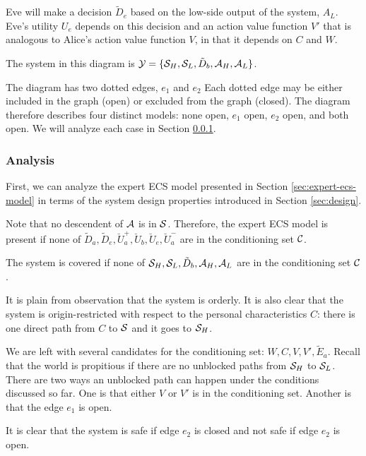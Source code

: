 \documentclass[../thesis.tex]{subfiles}
\begin{document}

Eve will make a decision $\tilde{D}_e$ based on
the low-side output of the system, $A_L$.
Eve's utility $U_e$ depends on this decision and
an action value function $V'$ that is analogous
to Alice's action value function $V$, in that
it depends on $C$ and $W$.

The system in this diagram is
$\mathcal{Y} = \{\mathcal{S}_H, \mathcal{S}_L, \tilde{D}_b, \mathcal{A}_H, \mathcal{A}_L\}$.

The diagram has two dotted edges, $e_1$ and $e_2$
Each dotted edge may be either included in the graph
(open) or excluded from the graph (closed).
The diagram therefore describes four distinct models:
none open, $e_1$ open, $e_2$ open, and both open.
We will analyze each case
in Section \ref{sec:expert-ecs-analysis}.


\subsubsection{Analysis}
\label{sec:expert-ecs-analysis}

First, we can analyze the expert ECS model
presented in Section \ref{sec:expert-ecs-model} in
terms of the system design properties introduced in
Section \ref{sec:design}.

Note that no descendent of $\mathcal{A}$ is in $\mathcal{S}$.
Therefore, the expert ECS model is present if none of
$\tilde{D}_a, \tilde{D}_e, \breve{U}^+_a, \breve{U}_b, \breve{U}_e,\breve{U}^-_a$
are in the conditioning set $\mathcal{C}$.

The system is covered if none of
$\mathcal{S}_H, \mathcal{S}_L, \tilde{D}_b, \mathcal{A}_H, \mathcal{A}_L$
are in the conditioning set $\mathcal{C}$.

It is plain from observation that the system is orderly.
It is also clear that the system is origin-restricted
with respect to the personal characteristics $C$:
there is one direct path from $C$ to $\mathcal{S}$ and it goes
to $\mathcal{S}_H$.

We are left with several candidates for the conditioning set:
$W, C, V, V', \tilde{E}_a$.
Recall that the world is propitious if there are no
unblocked paths from $\mathcal{S}_H$ to $\mathcal{S}_L$.
There are two ways an unblocked path can happen
under the conditions discussed so far.
One is that either $V$ or $V'$ is in the conditioning
set.
Another is that the edge $e_1$ is open.

It is clear that the system is safe if edge $e_2$ is closed
and not safe if edge $e_2$ is open.
\end{document}
